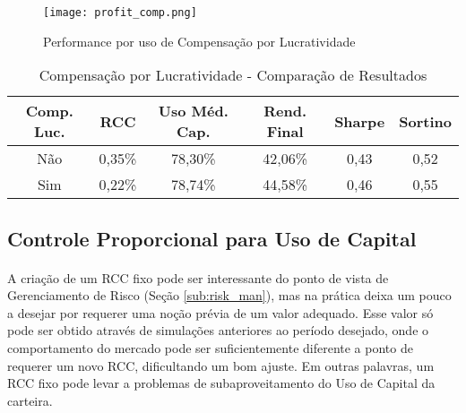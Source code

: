 \begin{figure}[!htb]
    \texttt{[image: profit\_comp.png]}
    \centering
    \caption{Performance por uso de Compensação por Lucratividade}
    \label{fig:141}
\end{figure}

\begin{table}[h!]
    \begin{center}
        \begin{tabular}{ c|cc|ccc }
            Comp. Luc. & RCC & Uso Méd. Cap. & Rend. Final & Sharpe & Sortino \\
            \hline
            Não & 0,35\% & 78,30\% & 42,06\% & 0,43 & 0,52 \\
            Sim & 0,22\% & 78,74\% & 44,58\% & 0,46 & 0,55 \\
        \end{tabular}
        \caption{Compensação por Lucratividade - Comparação de Resultados}
        \label{tab:9}
    \end{center}
\end{table}



\FloatBarrier
\subsection{Controle Proporcional para Uso de Capital}
\label{sub:dynamic_rcc}


\paragraph{} A criação de um RCC fixo pode ser interessante do ponto de vista de Gerenciamento de Risco (Seção \ref{sub:risk_man}), mas na prática deixa um pouco a desejar por requerer uma noção prévia de um valor adequado. Esse valor só pode ser obtido através de simulações anteriores ao período desejado, onde o comportamento do mercado pode ser suficientemente diferente a ponto de requerer um novo RCC, dificultando um bom ajuste. Em outras palavras, um RCC fixo pode levar a problemas de subaproveitamento do Uso de Capital da carteira.

